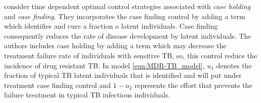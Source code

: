 	\citeauthor*{Lenhart2002} consider time dependent 
optimal control strategies associated with \emph{case holding} and 
\emph{case finding}. They 
incorporates the case finding control by adding a term which identifies and 
cure a fraction o latent individuals. Case finding consequently reduces the 
rate of disease development by latent individuals. The authors includes case 
holding by adding a term which may decrease the treatment failure rate of 
individuals with sensitive  TB, so, this control reduce the incidence of drug 
resistant TB. In model \eqref{eqn:MDR-TB_model}, $u_1$ denotes the fraction of 
typical TB latent individuals that is identified and will put under 
treatment \textemdash case finding control \textemdash and $1 - u_2$ represents 
the effort that prevents the failure treatment in typical TB infectious 
individuals.

